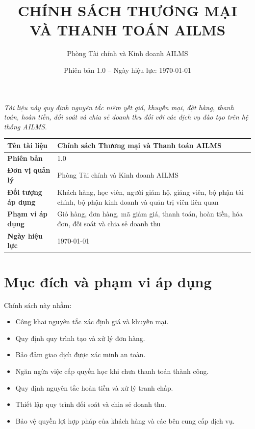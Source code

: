 \documentclass[12pt,a4paper]{article}
\title{
    \textbf{\LARGE CHÍNH SÁCH THƯƠNG MẠI\\
    VÀ THANH TOÁN AILMS}
}
\author{Phòng Tài chính và Kinh doanh AILMS}
\date{Phiên bản 1.0 -- Ngày hiệu lực: \today}
\begin{document}
\maketitle

\begin{center}
    \textit{Tài liệu này quy định nguyên tắc niêm yết giá, khuyến mại,
    đặt hàng, thanh toán, hoàn tiền, đối soát và chia sẻ doanh thu
    đối với các dịch vụ đào tạo trên hệ thống AILMS.}
\end{center}

\vspace{0.8cm}

\begin{longtable}{|>{\bfseries}p{4cm}|p{9.5cm}|}
    \hline
    Tên tài liệu &
    Chính sách Thương mại và Thanh toán AILMS \\
    \hline
    Phiên bản & 1.0 \\
    \hline
    Đơn vị quản lý &
    Phòng Tài chính và Kinh doanh AILMS \\
    \hline
    Đối tượng áp dụng &
    Khách hàng, học viên, người giám hộ, giảng viên,
    bộ phận tài chính, bộ phận kinh doanh và quản trị viên liên quan \\
    \hline
    Phạm vi áp dụng &
    Giỏ hàng, đơn hàng, mã giảm giá, thanh toán, hoàn tiền,
    hóa đơn, đối soát và chia sẻ doanh thu \\
    \hline
    Ngày hiệu lực & \today \\
    \hline
\end{longtable}

\tableofcontents
\newpage

\section{Mục đích và phạm vi áp dụng}

Chính sách này nhằm:

\begin{itemize}
    \item Công khai nguyên tắc xác định giá và khuyến mại.
    \item Quy định quy trình tạo và xử lý đơn hàng.
    \item Bảo đảm giao dịch được xác minh an toàn.
    \item Ngăn ngừa việc cấp quyền học khi chưa thanh toán thành công.
    \item Quy định nguyên tắc hoàn tiền và xử lý tranh chấp.
    \item Thiết lập quy trình đối soát và chia sẻ doanh thu.
    \item Bảo vệ quyền lợi hợp pháp của khách hàng và các bên cung cấp dịch vụ.
\end{itemize}
\end{document}
